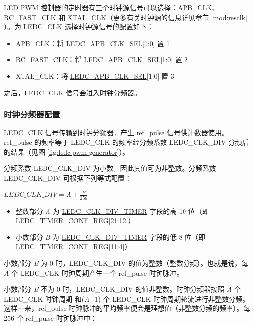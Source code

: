 \documentclass[main\_\_CN.tex]{subfiles}
\begin{document}
LED PWM 控制器的定时器有三个时钟源信号可以选择：APB\_CLK、RC\_FAST\_CLK 和 XTAL\_CLK（更多有关时钟源的信息详见章节 \ref{mod:resclk} \textit{}）。为 LEDC\_CLK 选择时钟源信号的配置如下：

\begin{itemize}
    \item APB\_CLK：将 \hyperref[fielddesc:LEDCAPBCLKSEL]{LEDC\_APB\_CLK\_SEL}[1:0] 置 1
    \item RC\_FAST\_CLK：将 \hyperref[fielddesc:LEDCAPBCLKSEL]{LEDC\_APB\_CLK\_SEL}[1:0] 置 2
    \item XTAL\_CLK：将 \hyperref[fielddesc:LEDCAPBCLKSEL]{LEDC\_APB\_CLK\_SEL}[1:0] 置 3
\end{itemize}

之后，LEDC\_CLK 信号会进入时钟分频器。

\subsubsection{时钟分频器配置}
LEDC\_CLK 信号传输到时钟分频器，产生 ref\_pulse 信号供计数器使用。ref\_pulse 的频率等于 LEDC\_CLK 的频率经分频系数 LEDC\_CLK\_DIV 分频后的结果（见图 \ref{fig:ledc-pwm-generator}）。

分频系数 LEDC\_CLK\_DIV 为小数，因此其值可为非整数。分频系数 LEDC\_CLK\_DIV  可根据下列等式配置：

\begin{center}
$LEDC\_CLK\_DIV = A + \frac{B}{256}$
\end{center}

\begin{itemize}
    \item 整数部分 \textit{A} 为 \hyperref[fielddesc:LEDCCLKDIVTIMERX]{LEDC\_CLK\_DIV\_TIMER} 字段的高 10 位（即 \hyperref[regdesc:LEDCTIMERXCONFREG]{LEDC\_TIMER\_CONF\_REG}[21:12]）
    \item 小数部分 \textit{B} 为 \hyperref[fielddesc:LEDCCLKDIVTIMERX]{LEDC\_CLK\_DIV\_TIMER} 字段的低 8 位（即 \hyperref[regdesc:LEDCTIMERXCONFREG]{LEDC\_TIMER\_CONF\_REG}[11:4]）
\end{itemize}

小数部分 \textit{B} 为 0 时，LEDC\_CLK\_DIV 的值为整数（整数分频）。也就是说，每 \textit{A} 个 LEDC\_CLK 时钟周期产生一个 ref\_pulse 时钟脉冲。

小数部分 \textit{B} 不为 0 时，LEDC\_CLK\_DIV 的值非整数。时钟分频器按照 \textit{A} 个 LEDC\_CLK 时钟周期 和(\textit{A}+1) 个 LEDC\_CLK 时钟周期轮流进行非整数分频。这样一来，ref\_pulse 时钟脉冲的平均频率便会是理想值（非整数分频的频率）。每 256 个 ref\_pulse 时钟脉冲中：
\end{document}
